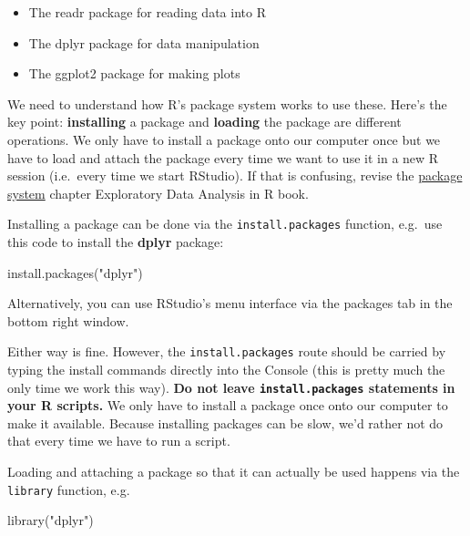 \documentclass[
]{book}
\newenvironment{Shaded}{\begin{snugshade}}{\end{snugshade}}
\newcommand{\FunctionTok}[1]{\textcolor[rgb]{0.00,0.00,0.00}{#1}}
\newcommand{\NormalTok}[1]{#1}
\newcommand{\StringTok}[1]{\textcolor[rgb]{0.31,0.60,0.02}{#1}}
\providecommand{\tightlist}{%
  \setlength{\itemsep}{0pt}\setlength{\parskip}{0pt}}
\begin{document}
\begin{itemize}
\tightlist
\item
  The readr package for reading data into R
\item
  The dplyr package for data manipulation
\item
  The ggplot2 package for making plots
\end{itemize}

We need to understand how R's package system works to use these. Here's the key point: \textbf{installing} a package and \textbf{loading} the package are different operations. We only have to install a package onto our computer once but we have to load and attach the package every time we want to use it in a new R session (i.e.~every time we start RStudio). If that is confusing, revise the \href{https://dzchilds.github.io/eda-for-bio/packages.html}{package system} chapter Exploratory Data Analysis in R book.

Installing a package can be done via the \texttt{install.packages} function, e.g.~use this code to install the \textbf{dplyr} package:

\begin{Shaded}
\begin{Highlighting}[]
\FunctionTok{install.packages}\NormalTok{(}\StringTok{"dplyr"}\NormalTok{)}
\end{Highlighting}
\end{Shaded}

Alternatively, you can use RStudio's menu interface via the packages tab in the bottom right window.

Either way is fine. However, the \texttt{install.packages} route should be carried by typing the install commands directly into the Console (this is pretty much the only time we work this way). \textbf{Do not leave \texttt{install.packages} statements in your R scripts.} We only have to install a package once onto our computer to make it available. Because installing packages can be slow, we'd rather not do that every time we have to run a script.

Loading and attaching a package so that it can actually be used happens via the \texttt{library} function, e.g.

\begin{Shaded}
\begin{Highlighting}[]
\FunctionTok{library}\NormalTok{(}\StringTok{"dplyr"}\NormalTok{)}
\end{Highlighting}
\end{Shaded}
\end{document}
